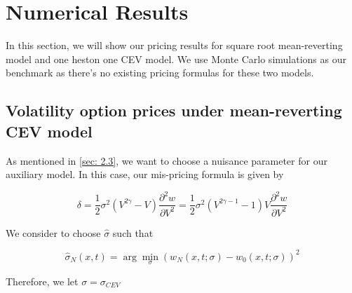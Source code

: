 \chapter{Numerical Results}

In this section, we will show our pricing results for square root mean-reverting model and one heston one CEV model. We use Monte Carlo simulations as our benchmark as there's no existing pricing formulas for these two models.

\section{Volatility option prices under mean-reverting CEV model}

As mentioned in \ref{sec: 2.3}, we want to choose a nuisance parameter for our auxiliary model. In this case, our mis-pricing formula is given by

$$
\delta = \frac{1}{2} \sigma^{2} (V^{2\gamma} - V) \frac{\partial^{2} w}{\partial V^{2}} = \frac{1}{2} \sigma^{2} (V^{2\gamma-1} -1)V \frac{\partial^{2} w}{\partial V^{2}}
$$

We consider to choose $\hat{\sigma}$ such that

$$
\hat{\sigma}_{N}(x, t)=\arg \min _{\sigma}\left(w_{N}(x, t ; \sigma)-w_{0}(x, t ; \sigma)\right)^{2}
$$

\noindent Therefore, we let $\sigma = \sigma_{CEV}$